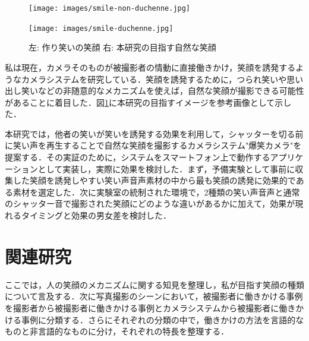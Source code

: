 \documentclass[report,10pt,uplatex,titlepage]{jsarticle}
\begin{document}
\begin{figure}[b!]

\begin{minipage}{0.14\columnwidth}\vspace{10 mm}\hspace{20 mm}
\end{minipage}
\begin{minipage}{0.35\columnwidth}
\begin{center}
\texttt{[image: images/smile-non-duchenne.jpg]}
\end{center}
\end{minipage}
\begin{minipage}{0.35\columnwidth}
\begin{center}
\texttt{[image: images/smile-duchenne.jpg]}
\end{center}
\end{minipage}
\begin{minipage}{0.14\columnwidth}
\end{minipage}

\label{hirashimasmile}
\begin{center}
\caption{左: 作り笑いの笑顔 右: 本研究の目指す自然な笑顔}

\end{center}
\end{figure}

私は現在，カメラそのものが被撮影者の情動に直接働きかけ，笑顔を誘発するようなカメラシステムを研究している．笑顔を誘発するために，つられ笑いや思い出し笑いなどの非随意的なメカニズムを使えば，自然な笑顔が撮影できる可能性があることに着目した．図\ref{hirashimasmile}に本研究の目指すイメージを参考画像として示した．

本研究では，他者の笑いが笑いを誘発する効果を利用して，シャッターを切る前に笑い声を再生することで自然な笑顔を撮影するカメラシステム"爆笑カメラ"を提案する．その実証のために，システムをスマートフォン上で動作するアプリケーションとして実装し，実際に効果を検討した．まず，予備実験として事前に収集した笑顔を誘発しやすい笑い声音声素材の中から最も笑顔の誘発に効果的である素材を選定した．次に実験室の統制された環境で，2種類の笑い声音声と通常のシャッター音で撮影された笑顔にどのような違いがあるかに加えて，効果が現れるタイミングと効果の男女差を検討した．

\section{関連研究}

ここでは，人の笑顔のメカニズムに関する知見を整理し，私が目指す笑顔の種類について言及する．次に写真撮影のシーンにおいて，被撮影者に働きかける事例を撮影者から被撮影者に働きかける事例とカメラシステムから被撮影者に働きかける事例に分類する．さらにそれぞれの分類の中で，働きかけの方法を言語的なものと非言語的なものに分け，それぞれの特長を整理する．
\end{document}
